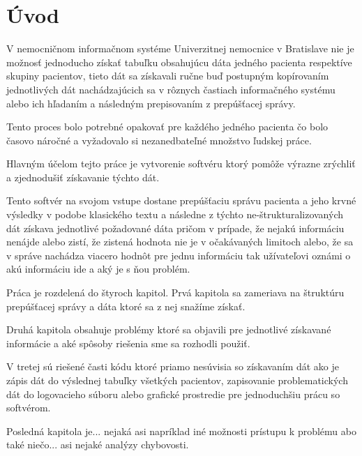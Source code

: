 \chapter*{Úvod} %

V nemocničnom informačnom systéme Univerzitnej nemocnice v Bratislave nie je možnosť jednoducho získať tabuľku obsahujúcu dáta jedného pacienta respektíve skupiny pacientov, tieto dát sa získavali ručne buď postupným kopírovaním jednotlivých dát nachádzajúcich sa v rôznych častiach informačného systému alebo ich hľadaním a následným prepisovaním z prepúšťacej správy.

Tento proces bolo potrebné opakovať pre každého jedného pacienta čo bolo časovo náročné a vyžadovalo si nezanedbateľné množstvo ľudskej práce.

Hlavným účelom tejto práce je vytvorenie softvéru ktorý pomôže výrazne zrýchliť a zjednodušiť získavanie týchto dát.

Tento softvér na svojom vstupe dostane prepúšťaciu správu pacienta a jeho krvné výsledky v podobe klasického textu a následne z týchto ne-štrukturalizovaných dát získava jednotlivé požadované dáta pričom v prípade, že nejakú informáciu nenájde alebo zistí, že zistená hodnota nie je v očakávaných limitoch alebo, že sa v správe nachádza viacero hodnôt pre jednu informáciu tak užívateľovi oznámi o akú informáciu ide a aký je s ňou problém. 

Práca je rozdelená do štyroch kapitol. Prvá kapitola sa zameriava na štruktúru prepúšťacej správy a dáta ktoré sa z nej snažíme získať.

Druhá kapitola obsahuje problémy ktoré sa objavili pre jednotlivé získavané informácie a aké spôsoby riešenia sme sa rozhodli použiť.

V tretej sú riešené časti kódu ktoré priamo nesúvisia so získavaním dát ako je zápis dát do výslednej tabuľky všetkých pacientov, zapisovanie problematických dát do logovacieho súboru alebo grafické prostredie pre jednoduchšiu prácu so softvérom.

Posledná kapitola je... nejaká asi napríklad iné možnosti prístupu k problému abo také niečo... asi nejaké analýzy chybovosti.



